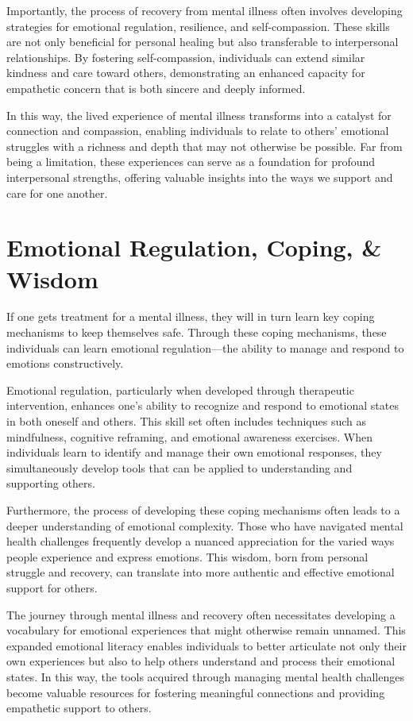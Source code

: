 \documentclass[stu]{apa7}
\begin{document}
Importantly, the process of recovery from mental illness often involves developing strategies for emotional regulation, resilience, and self-compassion. These skills are not only beneficial for personal healing but also transferable to interpersonal relationships. By fostering self-compassion, individuals can extend similar kindness and care toward others, demonstrating an enhanced capacity for empathetic concern that is both sincere and deeply informed.

In this way, the lived experience of mental illness transforms into a catalyst for connection and compassion, enabling individuals to relate to others' emotional struggles with a richness and depth that may not otherwise be possible. Far from being a limitation, these experiences can serve as a foundation for profound interpersonal strengths, offering valuable insights into the ways we support and care for one another.

\section{Emotional Regulation, Coping, \& Wisdom}

If one gets treatment for a mental illness, they will in turn learn key coping mechanisms to keep themselves safe. Through these coping mechanisms, these individuals can learn emotional regulation---the ability to manage and respond to emotions constructively.   

Emotional regulation, particularly when developed through therapeutic intervention, enhances one's ability to recognize and respond to emotional states in both oneself and others. This skill set often includes techniques such as mindfulness, cognitive reframing, and emotional awareness exercises. When individuals learn to identify and manage their own emotional responses, they simultaneously develop tools that can be applied to understanding and supporting others.

Furthermore, the process of developing these coping mechanisms often leads to a deeper understanding of emotional complexity. Those who have navigated mental health challenges frequently develop a nuanced appreciation for the varied ways people experience and express emotions. This wisdom, born from personal struggle and recovery, can translate into more authentic and effective emotional support for others.

The journey through mental illness and recovery often necessitates developing a vocabulary for emotional experiences that might otherwise remain unnamed. This expanded emotional literacy enables individuals to better articulate not only their own experiences but also to help others understand and process their emotional states. In this way, the tools acquired through managing mental health challenges become valuable resources for fostering meaningful connections and providing empathetic support to others.
\end{document}
